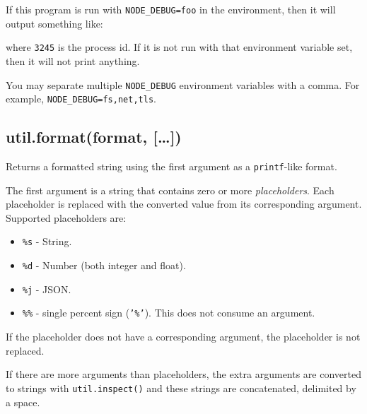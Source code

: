 If this program is run with \texttt{NODE\_DEBUG=foo} in the environment,
then it will output something like:

\begin{Shaded}
\begin{Highlighting}[]
\NormalTok{: hello from foo [}\NormalTok{]}
\end{Highlighting}
\end{Shaded}

where \texttt{3245} is the process id. If it is not run with that
environment variable set, then it will not print anything.

You may separate multiple \texttt{NODE\_DEBUG} environment variables
with a comma. For example, \texttt{NODE\_DEBUG=fs,net,tls}.

\subsection{util.format(format, {[}\ldots{}{]})}

Returns a formatted string using the first argument as a
\texttt{printf}-like format.

The first argument is a string that contains zero or more
\emph{placeholders}. Each placeholder is replaced with the converted
value from its corresponding argument. Supported placeholders are:

\begin{itemize}
\item
  \texttt{\%s} - String.
\item
  \texttt{\%d} - Number (both integer and float).
\item
  \texttt{\%j} - JSON.
\item
  \texttt{\%\%} - single percent sign (\texttt{'\%'}). This does not
  consume an argument.
\end{itemize}

If the placeholder does not have a corresponding argument, the
placeholder is not replaced.

\begin{Shaded}
\end{Shaded}

If there are more arguments than placeholders, the extra arguments are
converted to strings with \texttt{util.inspect()} and these strings are
concatenated, delimited by a space.

